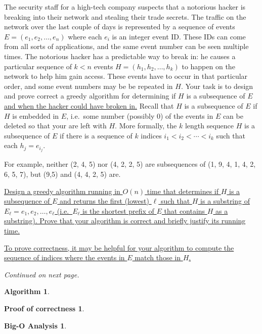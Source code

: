 \documentclass[11pt]{article}
\theoremstyle{definition}
\newtheorem*{algo}{Algorithm}
\newtheorem*{proofcorr}{Proof of correctness}
\newtheorem*{analysis}{Big-O Analysis}
\begin{document}
\begin{enumerate}
The security staff for a high-tech company suspects that a notorious hacker is breaking into their network and stealing their trade secrets.   
The traffic on the network over the last couple of days is represented by a sequence of 
events $E=(e_1, e_2, \ldots, e_n)$
where each $e_i$ is an integer event ID.  
These IDs can come from all sorts of applications, and the same event number can be seen multiple times.
The notorious hacker has a predictable way to break in:  he causes a particular 
sequence of $k<n$ events $H=(h_1, h_2, \ldots, h_k)$ to happen on the network to help him gain access.
These events have to occur in that particular order, and some event numbers may be be repeated in $H$.
Your task is to design and prove correct a greedy algorithm for determining if $H$ is a subsequence of $E$
\uline{and when the hacker could have broken in.}
Recall that $H$ is a subsequence of $E$ if $H$ is embedded in $E$, i.e.~some number (possibly 0) of the events in $E$ can be deleted so that your are left with $H$.  
More formally, the $k$ length sequence $H$ is a subsequence of $E$ if there is a sequence of $k$ indices 
$i_1 < i_2 < \cdots < i_k$ such that each $h_j = e_{i_j}$.

For example, neither (2, 4, 5) nor (4, 2, 2, 5) are subsequences of 
(1, 9, 4, 1, 4, 2, 6, 5, 7), but (9,5) and (4, 4, 2, 5) are.

\uline{
Design a greedy algorithm running in $O(n)$ time that determines if $H$ is a subsequence of $E$ and returns
the first (lowest) $\ell$ such that $H$ is a substring of $E_\ell = e_1, e_2, \ldots, e_\ell$ 
(i.e.~$E_{\ell}$ is the shortest prefix of $E$ that contains $H$ as a substring).
Prove that your algorithm is correct and briefly justify its running time.
}

\uline{
To prove correctness, it may be helpful for your algorithm to compute the sequence of indices where
the events in $E$ match those in $H$.
}

\textit{Continued on next page.}
\newpage
\begin{algo}


\end{algo}
\newpage
\begin{proofcorr}

\end{proofcorr}
\newpage
\begin{analysis}

\end{analysis}
\newpage

\end{enumerate} 
\end{document}
